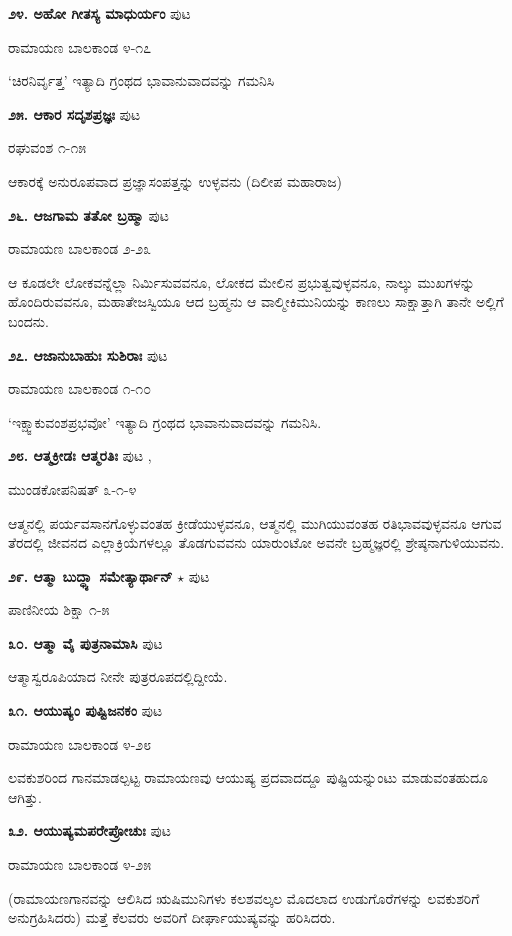 \medskip
\noindent\textbf{೨೪. ಅಹೋ ಗೀತಸ್ಯ ಮಾಧುರ್ಯಂ} \hfill ಪುಟ \pageref{159}

\hfill ರಾಮಾಯಣ ಬಾಲಕಾಂಡ ೪-೧೭

`ಚಿರನಿರ್ವೃತ್ತ' ಇತ್ಯಾದಿ ಗ್ರಂಥದ ಭಾವಾನುವಾದವನ್ನು ಗಮನಿಸಿ

\medskip
\noindent\textbf{೨೫. ಆಕಾರ ಸದೃಶಪ್ರಜ್ಞಃ} \hfill ಪುಟ \pageref{139a}

\hfill ರಘುವಂಶ ೧-೧೫

ಆಕಾರಕ್ಕೆ ಅನುರೂಪವಾದ ಪ್ರಜ್ಞಾಸಂಪತ್ತನ್ನು ಉಳ್ಳವನು (ದಿಲೀಪ ಮಹಾರಾಜ)

\medskip
\noindent\textbf{೨೬. ಆಜಗಾಮ ತತೋ ಬ್ರಹ್ಮಾ} \hfill ಪುಟ \pageref{202}

\hfill ರಾಮಾಯಣ ಬಾಲಕಾಂಡ ೨-೨೩

ಆ ಕೂಡಲೇ ಲೋಕವನ್ನೆಲ್ಲಾ ನಿರ್ಮಿಸುವವನೂ, ಲೋಕದ ಮೇಲಿನ ಪ್ರಭುತ್ವವುಳ್ಳವನೂ, ನಾಲ್ಕು ಮುಖಗಳನ್ನು ಹೊಂದಿರುವವನೂ, ಮಹಾತೇಜಸ್ವಿಯೂ ಆದ ಬ್ರಹ್ಮನು ಆ ವಾಲ್ಮೀಕಿಮುನಿಯನ್ನು ಕಾಣಲು ಸಾಕ್ಷಾತ್ತಾಗಿ ತಾನೇ ಅಲ್ಲಿಗೆ ಬಂದನು.

\medskip
\noindent\textbf{೨೭. ಆಜಾನುಬಾಹುಃ ಸುಶಿರಾಃ} \hfill ಪುಟ \pageref{247}

\hfill ರಾಮಾಯಣ ಬಾಲಕಾಂಡ ೧-೧೦

`ಇಕ್ಷ್ವಾಕುವಂಶಪ್ರಭವೋ' ಇತ್ಯಾದಿ ಗ್ರಂಥದ ಭಾವಾನುವಾದವನ್ನು ಗಮನಿಸಿ.

\medskip
\noindent\textbf{೨೮. ಆತ್ಮಕ್ರೀಡಃ ಆತ್ಮರತಿಃ} \hfill ಪುಟ \pageref{118},\pageref{143}

\hfill ಮುಂಡಕೋಪನಿಷತ್ ೩-೧-೪

ಆತ್ಮನಲ್ಲಿ ಪರ್ಯವಸಾನಗೊಳ್ಳುವಂತಹ ಕ್ರೀಡೆಯುಳ್ಳವನೂ, ಆತ್ಮನಲ್ಲಿ ಮುಗಿಯುವಂತಹ ರತಿಭಾವವುಳ್ಳವನೂ ಆಗುವ ತೆರದಲ್ಲಿ ಜೀವನದ ಎಲ್ಲಾಕ್ರಿಯೆಗಳಲ್ಲೂ ತೊಡಗುವವನು ಯಾರುಂಟೋ ಅವನೇ ಬ್ರಹ್ಮಜ್ಞರಲ್ಲಿ ಶ್ರೇಷ್ಠನಾಗುಳಿಯುವನು.

\medskip
\noindent\textbf{೨೯. ಆತ್ಮಾ ಬುದ್ಧ್ಯಾ ಸಮೇತ್ಯಾರ್ಥಾನ್} $\star$ \hfill ಪುಟ \pageref{18}

\hfill ಪಾಣಿನೀಯ ಶಿಕ್ಷಾ ೧-೫

\medskip
\noindent\textbf{೩೦. ಆತ್ಮಾ ವೈ ಪುತ್ರನಾಮಾಸಿ} \hfill ಪುಟ \pageref{228}

ಆತ್ಮಾಸ್ವರೂಪಿಯಾದ ನೀನೇ ಪುತ್ರರೂಪದಲ್ಲಿದ್ದೀಯೆ.

\medskip
\noindent\textbf{೩೧. ಆಯುಷ್ಯಂ ಪುಷ್ಟಿಜನಕಂ} \hfill ಪುಟ \pageref{210}

\hfill ರಾಮಾಯಣ ಬಾಲಕಾಂಡ ೪-೨೮

ಲವಕುಶರಿಂದ ಗಾನಮಾಡಲ್ಪಟ್ಟ ರಾಮಾಯಣವು ಆಯುಷ್ಯ ಪ್ರದವಾದದ್ದೂ ಪುಷ್ಟಿಯನ್ನುಂಟು ಮಾಡುವಂತಹುದೂ ಆಗಿತ್ತು.

\medskip
\noindent\textbf{೩೨. ಆಯುಷ್ಯಮಪರೇಪ್ರೋಚುಃ} \hfill ಪುಟ \pageref{168g}

\hfill ರಾಮಾಯಣ ಬಾಲಕಾಂಡ ೪-೨೫

(ರಾಮಾಯಣಗಾನವನ್ನು ಆಲಿಸಿದ ಋಷಿಮುನಿಗಳು ಕಲಶವಲ್ಕಲ ಮೊದಲಾದ ಉಡುಗೊರೆಗಳನ್ನು ಲವಕುಶರಿಗೆ ಅನುಗ್ರಹಿಸಿದರು) ಮತ್ತೆ ಕೆಲವರು ಅವರಿಗೆ ದೀರ್ಘಾಯುಷ್ಯವನ್ನು ಹರಿಸಿದರು.


